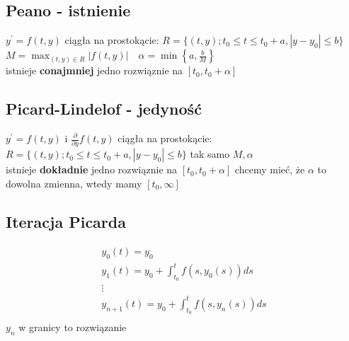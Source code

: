 \documentclass{article}
\begin{document}
\subsection*{Peano - istnienie}
$y^\prime = f(t,y)$ ciągła na prostokącie: $R = \{(t,y); t_0 \leq t \leq t_0 +a, |y-y_0| \leq b\}$\\
$M = \max_{(t,y) \in R}|f(t,y)| \quad \alpha = \min \left\{a,\frac{b}{M}\right\}$ \\
istnieje \textbf{conajmniej} jedno rozwiąznie na $[t_0,t_0+\alpha]$
\subsection*{Picard-Lindelof - jedyność}
$y^\prime = f(t,y)$ i $\frac{\partial}{\partial y} f(t,y)$ ciągła na prostokącie:\\
$R = \{(t,y); t_0 \leq t \leq t_0 +a, |y-y_0| \leq b\}$ tak samo $M,\alpha$\\
istnieje \textbf{dokładnie} jedno rozwiąznie na $[t_0,t_0+\alpha]$ chcemy mieć, że $\alpha$ to dowolna zmienna, wtedy mamy $[t_0,\infty]$
\subsection*{Iteracja Picarda}
\begin{align*}
y_0(t) = y_0\\
y_1(t) = y_0 + \int_{t_0}^t f(s,y_0(s))ds\\
\vdots\\
y_{n+1}(t) = y_0 + \int_{t_0}^t f(s,y_n(s))ds\\
\end{align*}
$y_n$ w granicy to rozwiązanie
\end{document}
